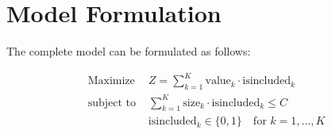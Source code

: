 \documentclass{article}
\begin{document}
\section{Model Formulation}
The complete model can be formulated as follows:

\begin{align*}
\text{Maximize } & Z = \sum_{k=1}^{K} \text{value}_k \cdot \text{isincluded}_k \\
\text{subject to } & \sum_{k=1}^{K} \text{size}_k \cdot \text{isincluded}_k \leq C \\
& \text{isincluded}_k \in \{0, 1\} \quad \text{for } k = 1, \ldots, K
\end{align*}
\end{document}
